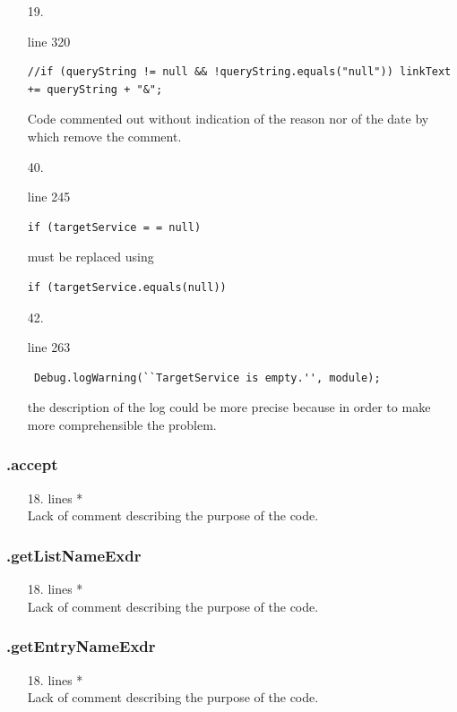 \documentclass[english]{article}
\begin{document}
\begin{itemize}
\item[19.]{ line 320
		\begin{lstlisting}
//if (queryString != null && !queryString.equals("null")) linkText += queryString + "&";	
		\end{lstlisting}
		Code commented out without indication of the reason nor of the date by which remove the comment.}
		

	
	\item[40.]{ line 245 
		\begin{lstlisting}
if (targetService = = null) 
		\end{lstlisting} must be replaced using
		\begin{lstlisting}
if (targetService.equals(null))
		\end{lstlisting}}
	
	
	 \item[42.]{line 263
		\begin{lstlisting} 
 Debug.logWarning(``TargetService is empty.'', module);
		\end{lstlisting}
		the description of the log could be more precise because in order to make more comprehensible the problem.}
\end{itemize}
\subsubsection*{.accept}
\begin{itemize}
\item[18.]{lines  *\\
		Lack of comment describing the purpose of the code.}
\end{itemize}
\subsubsection*{.getListNameExdr}
\begin{itemize}
\item[18.]{lines  *\\
		Lack of comment describing the purpose of the code.}
\end{itemize}
\subsubsection*{.getEntryNameExdr}
\begin{itemize}
\item[18.]{lines  *\\
		Lack of comment describing the purpose of the code.}
\end{itemize}
\end{document}
